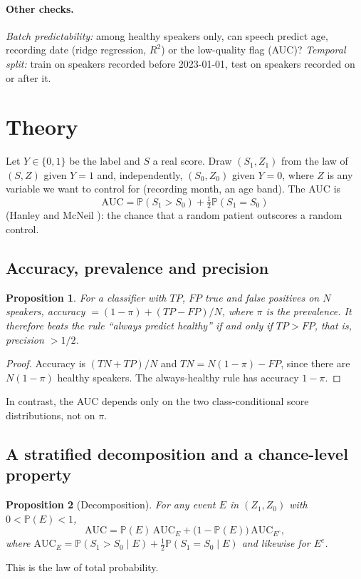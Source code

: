 \documentclass[10pt]{article}
\newtheorem{proposition}{Proposition}
\newcommand{\AUC}{\mathrm{AUC}}
\newcommand{\Prob}{\mathbb{P}}
\begin{document}
\paragraph{Other checks.} \emph{Batch predictability:} among healthy speakers only, can speech predict age, recording date (ridge regression, $R^2$) or the low-quality flag (AUC)? \emph{Temporal split:} train on speakers recorded before 2023-01-01, test on speakers recorded on or after it.

\section{Theory}\label{sec:theory}
Let $Y\in\{0,1\}$ be the label and $S$ a real score. Draw $(S_1,Z_1)$ from the law of $(S,Z)$ given $Y=1$ and, independently, $(S_0,Z_0)$ given $Y=0$, where $Z$ is any variable we want to control for (recording month, an age band). The AUC is
\[
\AUC=\Prob(S_1>S_0)+\tfrac12\Prob(S_1=S_0)
\]
(Hanley and McNeil \cite{hanley1982}): the chance that a random patient outscores a random control.

\subsection{Accuracy, prevalence and precision}\label{sec:acc}
\begin{proposition}\label{prop:acc}
For a classifier with $TP$, $FP$ true and false positives on $N$ speakers, accuracy $=(1-\pi)+(TP-FP)/N$, where $\pi$ is the prevalence. It therefore beats the rule ``always predict healthy'' if and only if $TP>FP$, that is, precision $>1/2$.
\end{proposition}
\begin{proof}
Accuracy is $(TN+TP)/N$ and $TN=N(1-\pi)-FP$, since there are $N(1-\pi)$ healthy speakers. The always-healthy rule has accuracy $1-\pi$. \qedhere
\end{proof}
In contrast, the AUC depends only on the two class-conditional score distributions, not on $\pi$.

\subsection{A stratified decomposition and a chance-level property}
\begin{proposition}[Decomposition]\label{prop:decomp}
For any event $E$ in $(Z_1,Z_0)$ with $0<\Prob(E)<1$,
\[
\AUC=\Prob(E)\,\AUC_E+\bigl(1-\Prob(E)\bigr)\,\AUC_{E^c},
\]
where $\AUC_E=\Prob(S_1>S_0\mid E)+\tfrac12\Prob(S_1=S_0\mid E)$ and likewise for $E^c$.
\end{proposition}
This is the law of total probability.
\end{document}
